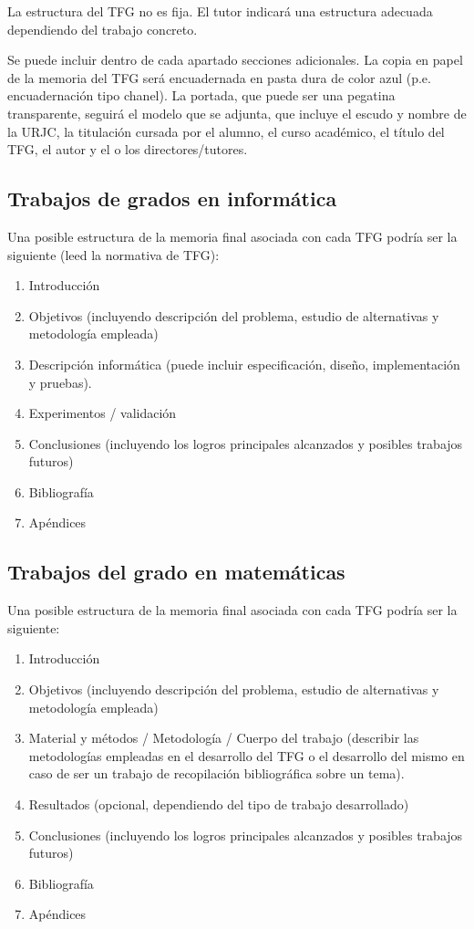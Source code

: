 \documentclass[12pt,twoside,titlepage]{report}
\begin{document}
La estructura del TFG no es fija. El tutor indicará una estructura adecuada dependiendo del trabajo concreto.

Se puede incluir dentro de cada apartado secciones adicionales. La copia en papel de la memoria del TFG será encuadernada en pasta dura de color azul (p.e. encuadernación tipo chanel). La portada, que puede ser una pegatina transparente, seguirá el modelo que se adjunta, que incluye el escudo y nombre de la URJC, la titulación cursada por el alumno, el curso académico, el título del TFG, el autor y el o los directores/tutores.


\subsection{Trabajos de grados en informática}

Una posible estructura de la memoria final asociada con cada TFG podría ser la siguiente (leed la normativa de TFG):
\begin{enumerate}
 \item Introducción
 \item Objetivos (incluyendo descripción del problema, estudio de alternativas y metodología empleada)
 \item Descripción informática (puede incluir especificación, diseño, implementación y pruebas).
 \item Experimentos / validación
 \item Conclusiones (incluyendo los logros principales alcanzados y posibles trabajos futuros)
 \item Bibliografía
 \item Apéndices
\end{enumerate}


\subsection{Trabajos del grado en matemáticas}

Una posible estructura de la memoria final asociada con cada TFG podría ser la siguiente:
\begin{enumerate}
 \item Introducción
 \item Objetivos (incluyendo descripción del problema, estudio de alternativas y metodología empleada)
 \item Material y métodos / Metodología / Cuerpo del trabajo (describir las metodologías empleadas en el desarrollo del TFG o el desarrollo del mismo en caso de ser un trabajo de recopilación bibliográfica sobre un tema).
 \item Resultados (opcional, dependiendo del tipo de trabajo desarrollado)
 \item Conclusiones (incluyendo los logros principales alcanzados y posibles trabajos futuros)
 \item Bibliografía
 \item Apéndices
\end{enumerate}
\end{document}
